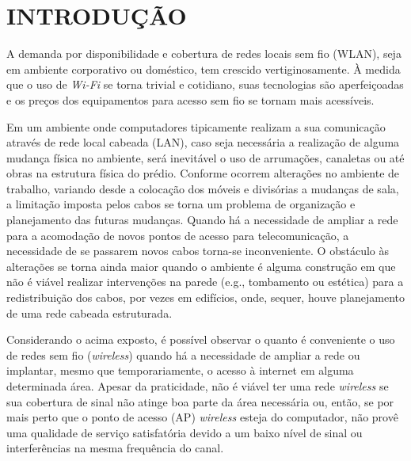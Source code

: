 \documentclass[
	12pt,				%
	openright,			%
	twoside,			%
	a4paper,			%
	english,			%
	french,				%
	spanish,			%
	brazil				%
	]{abntex2}
\begin{document}
\tableofcontents*
\cleardoublepage

\textual
\chapter[INTRODUÇÃO]{INTRODUÇÃO}

A demanda por disponibilidade e cobertura de redes locais sem fio (WLAN), seja em ambiente corporativo ou doméstico, tem crescido vertiginosamente. À medida que o uso de \textit{Wi-Fi} se torna trivial e cotidiano, suas tecnologias são aperfeiçoadas e os preços dos equipamentos para acesso sem fio se tornam mais acessíveis.

Em um ambiente onde computadores tipicamente realizam a sua comunicação através de rede local cabeada (LAN), caso seja necessária a realização de alguma mudança física no ambiente, será inevitável o uso de arrumações, canaletas ou até obras na estrutura física do prédio. Conforme ocorrem alterações no ambiente de trabalho, variando desde a colocação dos móveis e divisórias a mudanças de sala, a limitação imposta pelos cabos se torna um problema de organização e planejamento das futuras mudanças. Quando há a necessidade de ampliar a rede para a acomodação de novos pontos de acesso para telecomunicação, a necessidade de se passarem novos cabos torna-se inconveniente. O obstáculo às alterações se torna ainda maior quando o ambiente é alguma construção em que não é viável realizar intervenções na parede (e.g., tombamento ou estética) para a redistribuição dos cabos, por vezes em edifícios, onde, sequer, houve planejamento de uma rede cabeada estruturada.

Considerando o acima exposto, é possível observar o quanto é conveniente o uso de redes sem fio (\textit{wireless}) quando há a necessidade de ampliar a rede ou implantar, mesmo que temporariamente, o acesso à internet em alguma determinada área. Apesar da praticidade, não é viável ter uma rede \textit{wireless} se sua cobertura de sinal não atinge boa parte da área necessária ou, então, se por mais perto que o ponto de acesso (AP) \textit{wireless} esteja do computador, não provê uma qualidade de serviço satisfatória devido a um baixo nível de sinal ou interferências na mesma frequência do canal. 
\end{document}
